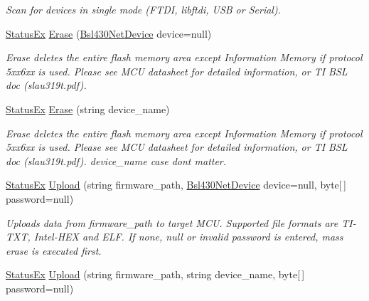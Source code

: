 \begin{DoxyCompactItemize}
\begin{DoxyCompactList}\small\item\em Scan for devices in single mode (F\+T\+DI, libftdi, U\+SB or Serial). \end{DoxyCompactList}\item 
\mbox{\hyperlink{class_b_s_l430___n_e_t_1_1_status_ex}{Status\+Ex}} \mbox{\hyperlink{class_b_s_l430___n_e_t_1_1_b_s_l430_n_e_t_a355e17f3dd02eb96810a36661f8e4b8d}{Erase}} (\mbox{\hyperlink{class_b_s_l430___n_e_t_1_1_bsl430_net_device}{Bsl430\+Net\+Device}} device=null)
\begin{DoxyCompactList}\small\item\em Erase deletes the entire flash memory area except Information Memory if protocol 5xx6xx is used. Please see M\+CU datasheet for detailed information, or TI B\+SL doc (slau319t.\+pdf). \end{DoxyCompactList}\item 
\mbox{\hyperlink{class_b_s_l430___n_e_t_1_1_status_ex}{Status\+Ex}} \mbox{\hyperlink{class_b_s_l430___n_e_t_1_1_b_s_l430_n_e_t_a994ac47f526248a23eeb108d38404366}{Erase}} (string device\+\_\+name)
\begin{DoxyCompactList}\small\item\em Erase deletes the entire flash memory area except Information Memory if protocol 5xx6xx is used. Please see M\+CU datasheet for detailed information, or TI B\+SL doc (slau319t.\+pdf). device\+\_\+name case dont matter. \end{DoxyCompactList}\item 
\mbox{\hyperlink{class_b_s_l430___n_e_t_1_1_status_ex}{Status\+Ex}} \mbox{\hyperlink{class_b_s_l430___n_e_t_1_1_b_s_l430_n_e_t_aaa54534dbbc4b9b255bffe5d6e29ba40}{Upload}} (string firmware\+\_\+path, \mbox{\hyperlink{class_b_s_l430___n_e_t_1_1_bsl430_net_device}{Bsl430\+Net\+Device}} device=null, byte\mbox{[}$\,$\mbox{]} password=null)
\begin{DoxyCompactList}\small\item\em Uploads data from firmware\+\_\+path to target M\+CU. Supported file formats are T\+I-\/\+T\+XT, Intel-\/\+H\+EX and E\+LF. If none, null or invalid password is entered, mass erase is executed first. \end{DoxyCompactList}\item 
\mbox{\hyperlink{class_b_s_l430___n_e_t_1_1_status_ex}{Status\+Ex}} \mbox{\hyperlink{class_b_s_l430___n_e_t_1_1_b_s_l430_n_e_t_a34ea55282fe44a886e4382caf4e391fc}{Upload}} (string firmware\+\_\+path, string device\+\_\+name, byte\mbox{[}$\,$\mbox{]} password=null)

\end{DoxyCompactItemize}
